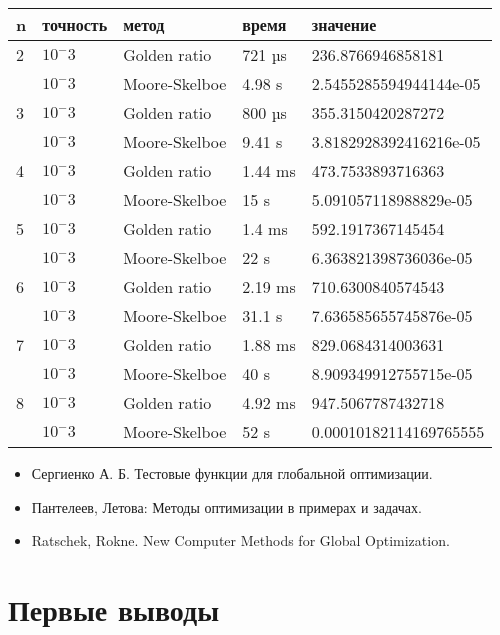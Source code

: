 \documentclass{article}
\begin{document}
    \begin{tabular}{ |p{2cm}|p{2cm}|p{3cm}|p{2cm}|p{4cm}|  }
        \hline
        n & точность & метод         & время   & значение               \\
        \hline
        2 & $10^-3$  & Golden ratio  & 721 µs  & 236.8766946858181      \\\cline{2-5}
        & $10^-3$  & Moore-Skelboe & 4.98 s  & 2.5455285594944144e-05 \\
        \hline
        3 & $10^-3$  & Golden ratio  & 800 µs  & 355.3150420287272      \\\cline{2-5}
        & $10^-3$  & Moore-Skelboe & 9.41 s  & 3.8182928392416216e-05 \\
        \hline
        4 & $10^-3$  & Golden ratio  & 1.44 ms & 473.7533893716363      \\\cline{2-5}
        & $10^-3$  & Moore-Skelboe & 15 s    & 5.091057118988829e-05  \\
        \hline
        5 & $10^-3$  & Golden ratio  & 1.4 ms  & 592.1917367145454      \\\cline{2-5}
        & $10^-3$  & Moore-Skelboe & 22 s    & 6.363821398736036e-05  \\
        \hline
        6 & $10^-3$  & Golden ratio  & 2.19 ms & 710.6300840574543      \\\cline{2-5}
        & $10^-3$  & Moore-Skelboe & 31.1 s  & 7.636585655745876e-05  \\
        \hline
        7 & $10^-3$  & Golden ratio  & 1.88 ms & 829.0684314003631      \\\cline{2-5}
        & $10^-3$  & Moore-Skelboe & 40 s    & 8.909349912755715e-05  \\
        \hline
        8 & $10^-3$  & Golden ratio  & 4.92 ms & 947.5067787432718      \\\cline{2-5}
        & $10^-3$  & Moore-Skelboe & 52 s    & 0.00010182114169765555 \\
        \hline

    \end{tabular}






    \newpage
    
    


    \begin{itemize}
        \item Сергиенко А. Б. Тестовые функции для глобальной оптимизации.
        \item Пантелеев, Летова: Методы оптимизации в примерах и задачах.
        \item Ratschek, Rokne. New Computer Methods for Global Optimization.

    \end{itemize}

    \section{Первые выводы}
\end{document}
